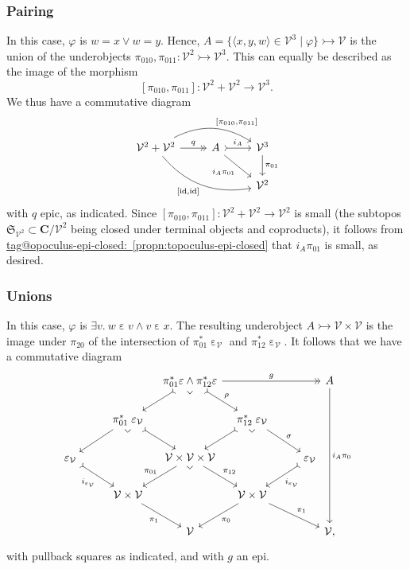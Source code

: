 \documentclass{amsart}
\makeatletter
\newcommand\bC{\mathbf{C}}
\newcommand\br[1]{\langle{}#1\rangle{}}
\newcommand\cV{\mathcal{V}}
\newcommand\ein{\mathrel{\varepsilon}}
\newcommand\fS{\mathfrak{S}}
\newcommand\id{\mathrm{id}}
\newcommand\pbr{\ar[dd, phantom, "\lrcorner" {pos=0, rotate=-45}]}
\renewcommand\phi{\varphi}
\newcommand\set[2][]{#1\{ #2 #1\}}
\newcommand\tto{\rightarrowtail}
\newcommand\unein{{\ein}}
\newcommand\tagword[1]{\csname tag@#1\endcsname}
\def\label@tag#1:#2\@nil{#1}
\newcommand\labeltag[1]{\label@tag#1:\@nil}
\newcommand\jref[1]{%
  \texorpdfstring%
    {\hyperref[#1]{\tagword{\labeltag{#1}}~\ref*{#1}}}%
    {\tagword{\labeltag{#1}}~\ref*{#1}}%
}
\theoremstyle{definition}
\theoremstyle{remark}
\theoremstyle{plainwithref}
\makeatother
\begin{document}
\subsubsection{Pairing}
In this case, \( \phi \) is \( w = x \vee w = y \).
Hence, \( A = \set{\br{x,y,w} \in \cV^3 \mid \phi} \tto \cV \) is the union of the underobjects \( \pi_{010},\pi_{011} \colon \cV^2 \tto \cV^3 \).
This can equally be described as the image of the morphism
\[
  [\pi_{010},\pi_{011}] \colon \cV^2 + \cV^2 \to \cV^3.
\]
We thus have a commutative diagram
\[
  \begin{tikzcd}
    \cV^2 + \cV^2 \ar[r, "q", ->>] \ar[rr, bend left, "{[\pi_{010},\pi_{011}]}"] \ar[rrd, "{[\id, \id]}"', bend right] &
    A \ar[r, "i_A", >->] \ar[rd, "i_A \pi_{01}"'] & \cV^3 \ar[d, "\pi_{01}"] \\
    & & \cV^2
  \end{tikzcd}
\]
with \( q \) epic, as indicated.
Since \( [\pi_{010},\pi_{011}] \colon \cV^2 + \cV^2 \to \cV^2 \) is small (the subtopos \( \fS_{\cV^2} \subset \bC / \cV^2 \) being closed under terminal objects and coproducts), it follows from \jref{propn:topoculus-epi-closed} that \( i_A \pi_{01} \) is small, as desired.

\subsubsection{Unions}
In this case, \( \phi \) is \( \exists v.\ w \ein v \wedge v \ein x \).
The resulting underobject \( A \tto \cV \times \cV \) is the image under \( \pi_{20} \) of the intersection of \( \pi_{01}^* \ein_{\cV} \) and \( \pi_{12}^* \ein_{\cV} \).
It follows that we have a commutative diagram
\[
  \begin{tikzcd}
    & &[-15pt] \pi_{01}^* \unein \wedge \pi_{12}^* \unein \ar[dl, >->] \ar[dr, >->, "\rho"] \ar[rrr, "g", ->>] \pbr &[-15pt] & &[-25pt] A \ar[dddd, "i_A \pi_0"] \\
    & \pi_{01}^* \ein_\cV \ar[dl] \ar[dr, >->] \pbr & & \pi_{12}^* \ein_\cV \ar[dl, >->] \ar[dr, "\sigma"] \pbr \\
    \ein_{\cV} \ar[dr, >->, "i_{\ein_{\cV}}"'] & & \cV \times \cV \times \cV \ar[dl, "\pi_{01}"'] \ar[dr, "\pi_{12}"] \pbr & & \ein_{\cV} \ar[dl, >->, "i_{\ein_{\cV}}"] \\
    & \cV \times \cV \ar[dr, "\pi_1"'] & & \cV \times \cV \ar[dl, "\pi_0"] \ar[drr, "\pi_1"] \\
    & & \cV & & & \cV,
  \end{tikzcd}
\]
with pullback squares as indicated, and with \( g \) an epi.
\end{document}
